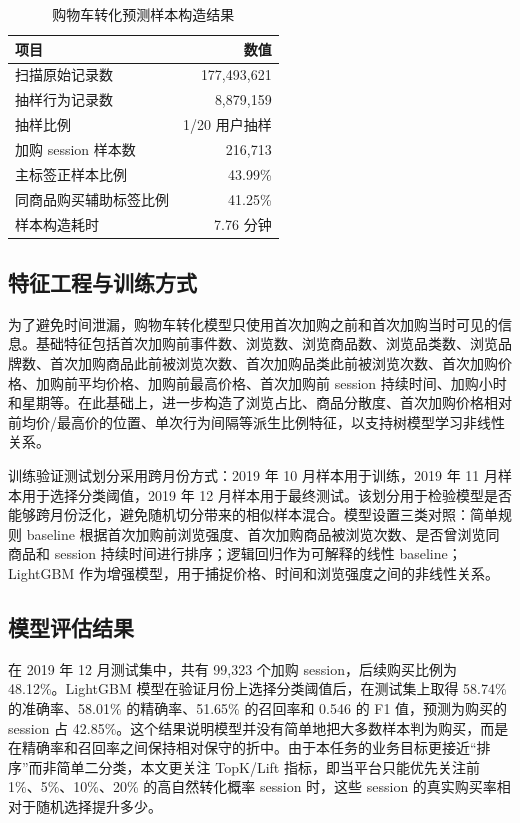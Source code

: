 \documentclass[12pt,hyperref,a4paper,UTF8]{ctexart}
\begin{document}
\begin{table}[H]
\centering
\caption{购物车转化预测样本构造结果}
\begin{tabular}{lr}
\toprule
项目 & 数值 \\
\midrule
扫描原始记录数 & 177,493,621 \\
抽样行为记录数 & 8,879,159 \\
抽样比例 & 1/20 用户抽样 \\
加购 session 样本数 & 216,713 \\
主标签正样本比例 & 43.99\% \\
同商品购买辅助标签比例 & 41.25\% \\
样本构造耗时 & 7.76 分钟 \\
\bottomrule
\end{tabular}
\end{table}

\subsection{特征工程与训练方式}

为了避免时间泄漏，购物车转化模型只使用首次加购之前和首次加购当时可见的信息。基础特征包括首次加购前事件数、浏览数、浏览商品数、浏览品类数、浏览品牌数、首次加购商品此前被浏览次数、首次加购品类此前被浏览次数、首次加购价格、加购前平均价格、加购前最高价格、首次加购前 session 持续时间、加购小时和星期等。在此基础上，进一步构造了浏览占比、商品分散度、首次加购价格相对前均价/最高价的位置、单次行为间隔等派生比例特征，以支持树模型学习非线性关系。

训练验证测试划分采用跨月份方式：2019 年 10 月样本用于训练，2019 年 11 月样本用于选择分类阈值，2019 年 12 月样本用于最终测试。该划分用于检验模型是否能够跨月份泛化，避免随机切分带来的相似样本混合。模型设置三类对照：简单规则 baseline 根据首次加购前浏览强度、首次加购商品被浏览次数、是否曾浏览同商品和 session 持续时间进行排序；逻辑回归作为可解释的线性 baseline；LightGBM 作为增强模型，用于捕捉价格、时间和浏览强度之间的非线性关系。

\subsection{模型评估结果}

在 2019 年 12 月测试集中，共有 99,323 个加购 session，后续购买比例为 48.12\%。LightGBM 模型在验证月份上选择分类阈值后，在测试集上取得 58.74\% 的准确率、58.01\% 的精确率、51.65\% 的召回率和 0.546 的 F1 值，预测为购买的 session 占 42.85\%。这个结果说明模型并没有简单地把大多数样本判为购买，而是在精确率和召回率之间保持相对保守的折中。由于本任务的业务目标更接近“排序”而非简单二分类，本文更关注 TopK/Lift 指标，即当平台只能优先关注前 1\%、5\%、10\%、20\% 的高自然转化概率 session 时，这些 session 的真实购买率相对于随机选择提升多少。
\end{document}
